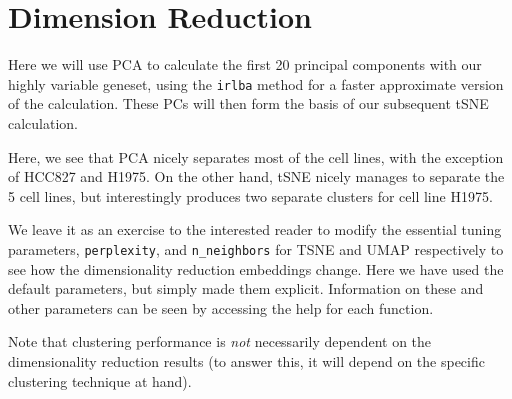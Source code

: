 \documentclass[]{book}
\newenvironment{Shaded}{\begin{snugshade}}{\end{snugshade}}
\newcommand{\DataTypeTok}[1]{\textcolor[rgb]{0.13,0.29,0.53}{#1}}
\newcommand{\DecValTok}[1]{\textcolor[rgb]{0.00,0.00,0.81}{#1}}
\newcommand{\KeywordTok}[1]{\textcolor[rgb]{0.13,0.29,0.53}{\textbf{#1}}}
\newcommand{\NormalTok}[1]{#1}
\newcommand{\OperatorTok}[1]{\textcolor[rgb]{0.81,0.36,0.00}{\textbf{#1}}}
\newcommand{\StringTok}[1]{\textcolor[rgb]{0.31,0.60,0.02}{#1}}
\begin{document}
\hypertarget{dimension-reduction}{%
\section{Dimension Reduction}\label{dimension-reduction}}

Here we will use PCA to calculate the first 20 principal components with our highly variable geneset, using the \texttt{irlba} method for a faster approximate version of the calculation. These PCs will then form the basis of our subsequent tSNE calculation.

\begin{Shaded}
\end{Shaded}

Here, we see that PCA nicely separates most of the cell lines, with the exception of HCC827 and H1975. On the other hand, tSNE nicely manages to separate the 5 cell lines, but interestingly produces two separate clusters for cell line H1975.

We leave it as an exercise to the interested reader to modify the essential tuning parameters, \texttt{perplexity}, and \texttt{n\_neighbors} for TSNE and UMAP respectively to see how the dimensionality reduction embeddings change. Here we have used the default parameters, but simply made them explicit. Information on these and other parameters can be seen by accessing the help for each function.

Note that clustering performance is \emph{not} necessarily dependent on the dimensionality reduction results (to answer this, it will depend on the specific clustering technique at hand).
\end{document}
